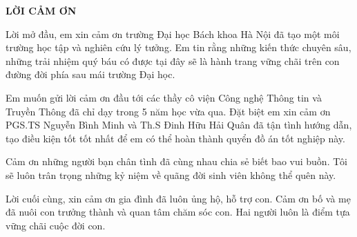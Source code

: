 \documentclass[../DoAn.tex]{subfiles}
\begin{document}
\begin{center}
    \Large{\textbf{LỜI CẢM ƠN}}\\
\end{center}
\vspace{1cm}

Lời mở đầu, em xin cảm ơn trường Đại học Bách khoa Hà Nội đã tạo một môi trường học tập và nghiên cứu lý tưởng. Em tin rằng những kiến thức chuyên sâu, những trải nhiệm quý báu có được tại đây sẽ là hành trang vững chãi trên con đường đời phía sau mái trường Đại học.

Em muốn gửi lời cảm ơn đầu tới các thầy cô viện Công nghệ Thông tin và Truyền Thông đã chỉ dạy trong 5 năm học vừa qua. Đặt biệt em xin cảm ơn PGS.TS Nguyễn Bình Minh và Th.S Đinh Hữu Hải Quân đã tận tình hướng dẫn, tạo điều kiện tốt tốt nhất để em có thể hoàn thành quyển đồ án tốt nghiệp này.

Cảm ơn những người bạn chân tình đã cùng nhau chia sẻ biết bao vui buồn. Tôi sẽ luôn trân trọng những kỷ niệm về quãng đời sinh viên không thể quên này.

Lời cuối cùng, xin cảm ơn gia đình đã luôn ủng hộ, hỗ trợ con. Cảm ơn bố và mẹ đã nuôi con trưởng thành và quan tâm chăm sóc con. Hai người luôn là điểm tựa vững chãi cuộc đời con.
\end{document}
